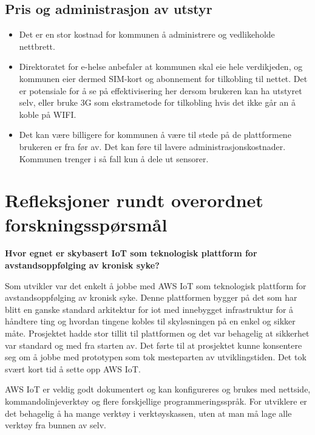 \subsection{Pris og administrasjon av utstyr}
\begin{itemize}
    \item Det er en stor kostnad for kommunen å administrere og vedlikeholde nettbrett.
    \item Direktoratet for e-helse anbefaler at kommunen skal eie hele verdikjeden, og kommunen eier
        dermed SIM-kort og abonnement for tilkobling til nettet. Det er potensiale for å se på
        effektivisering her dersom brukeren kan ha utstyret selv, eller bruke 3G som ekstrametode
        for tilkobling hvis det ikke går an å koble på WIFI.
    \item Det kan være billigere for kommunen å være til stede på de plattformene brukeren er fra før av.
        Det kan føre til lavere administrasjonskostnader. Kommunen trenger i så fall kun å dele ut sensorer.
\end{itemize}

\section{Refleksjoner rundt overordnet forskningsspørsmål}
\textbf{Hvor egnet er skybasert IoT som teknologisk plattform for avstandsoppfølging av kronisk syke?}

Som utvikler var det enkelt å jobbe med AWS IoT som teknologisk plattform for avstandsoppfølging av kronisk
syke. Denne plattformen bygger på det som har blitt en ganske standard arkitektur for \gls{iot}
med innebygget infrastruktur for å håndtere ting og hvordan tingene kobles til skyløsningen på en enkel og sikker
måte. Prosjektet hadde stor tillit til plattformen og det var behagelig at sikkerhet var standard
og med fra starten av. Det førte til at prosjektet kunne konsentere seg om å jobbe med prototypen som tok
mesteparten av utviklingstiden. Det tok svært kort tid å sette opp AWS IoT.

AWS IoT er veldig godt dokumentert og kan konfigureres og brukes med nettside, kommandolinjeverktøy og
flere forskjellige programmeringsspråk. For utviklere er det behagelig å ha mange verktøy i verktøyskassen,
uten at man må lage alle verktøy fra bunnen av selv.

